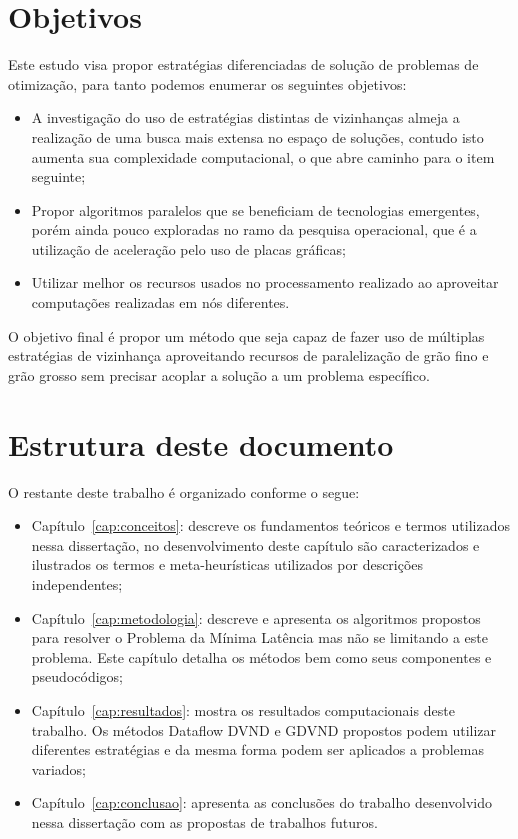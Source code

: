 \section{Objetivos} \label{sec:objetivos}

Este estudo visa propor estratégias diferenciadas de solução de problemas de otimização, para tanto podemos enumerar os seguintes objetivos:
\begin{itemize}
    \item{A investigação do uso de estratégias distintas de vizinhanças almeja a realização de uma busca mais extensa no espaço de soluções, contudo isto aumenta sua complexidade computacional, o que abre caminho para o item seguinte;}
    \item{Propor algoritmos paralelos que se beneficiam de tecnologias emergentes, porém ainda pouco exploradas no ramo da pesquisa operacional, que é a utilização de aceleração pelo uso de placas gráficas;}
    \item{Utilizar melhor os recursos usados no processamento realizado ao aproveitar computações realizadas em nós diferentes.}
\end{itemize}

O objetivo final é propor um método que seja capaz de fazer uso de múltiplas estratégias de vizinhança aproveitando recursos de paralelização de grão fino e grão grosso sem precisar acoplar a solução a um problema específico.

\section{Estrutura deste documento}\label{sec:estrutura}

O restante deste trabalho é organizado conforme o segue:

\begin{itemize}
    \item Capítulo~\ref{cap:conceitos}: descreve os fundamentos teóricos e termos utilizados nessa dissertação, no desenvolvimento deste capítulo são caracterizados e ilustrados os termos e meta-heurísticas utilizados por descrições independentes;
    \item Capítulo~\ref{cap:metodologia}: descreve e apresenta os algoritmos propostos para resolver o Problema da Mínima Latência mas não se limitando a este problema. Este capítulo detalha os métodos bem como seus componentes e pseudocódigos;
    \item Capítulo~\ref{cap:resultados}: mostra os resultados computacionais deste trabalho. Os métodos Dataflow DVND e GDVND propostos podem utilizar diferentes estratégias e da mesma forma podem ser aplicados a problemas variados;
    \item Capítulo~\ref{cap:conclusao}: apresenta as conclusões do trabalho desenvolvido nessa dissertação com as propostas de trabalhos futuros.
\end{itemize}
